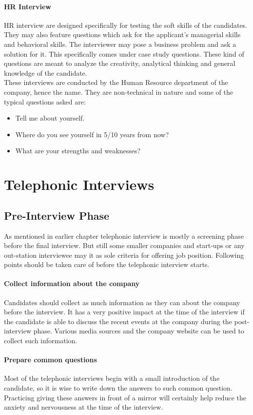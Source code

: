\documentclass[a4paper,12pt]{report}
\begin{document}
\subsubsection{HR Interview}
HR interview are designed specifically for testing the soft skills of the candidates. They may also feature questions
which ask for the applicant's managerial skills and behavioral skills. The interviewer may pose a business problem 
and ask a solution for it. This specifically comes under case study questions. These kind of questions are meant to
analyze the creativity, analytical thinking and general knowledge of the candidate.\\
These interviews are conducted by the Human Resource department of the company, hence the name. They are non-technical 
in nature and some of the typical questions asked are:
\begin{itemize}
 \item Tell me about yourself.
 \item Where do you see yourself in 5/10 years from now?
 \item What are your strengths and weaknesses?
\end{itemize}

\chapter{Telephonic Interviews}
\section{Pre-Interview Phase}
As mentioned in earlier chapter telephonic interview is mostly a screening phase before the final interview. But still some
smaller companies and start-ups or any out-station interviewee may it as sole criteria for offering job position. Following points should
be taken care of before the telephonic interview starts.
\subsubsection{Collect information about the company}
Candidates should collect as much information as they can about the company before the interview. It has
a very positive impact at the time of the interview if the candidate is able to discuss the recent events at
the company during the post-interview phase. Various media sources and the company website can be used to
collect such information.
\subsubsection{Prepare common questions}
Most of the telephonic interviews begin with a small introduction of the candidate, so it is wise to write
down the answers to such common question. Practicing giving these answers in front of a mirror will certainly
help reduce the anxiety and nervousness at the time of the interview.
\end{document}
